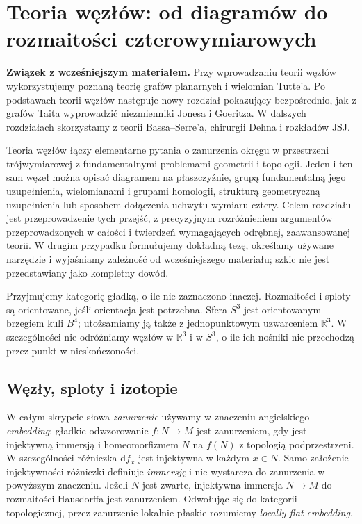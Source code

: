 \chapter{Teoria węzłów: od diagramów do rozmaitości czterowymiarowych}
\label{ch:teoria-wezlow}

\noindent\textbf{Związek z wcześniejszym materiałem.}
Przy wprowadzaniu teorii węzłów wykorzystujemy poznaną teorię
grafów planarnych i wielomian Tutte'a. Po podstawach teorii
węzłów następuje nowy rozdział pokazujący bezpośrednio, jak
z grafów Taita wyprowadzić niezmienniki Jonesa i Goeritza.
W dalszych rozdziałach skorzystamy z teorii Bassa--Serre'a,
chirurgii Dehna i rozkładów JSJ.


Teoria węzłów łączy elementarne pytania o zanurzenia okręgu w przestrzeni
trójwymiarowej z fundamentalnymi problemami geometrii i topologii.
Jeden i ten sam węzeł można opisać diagramem na płaszczyźnie, grupą
fundamentalną jego uzupełnienia, wielomianami i grupami homologii,
strukturą geometryczną uzupełnienia lub sposobem dołączenia uchwytu
wymiaru cztery. Celem rozdziału jest przeprowadzenie tych przejść,
z precyzyjnym rozróżnieniem argumentów przeprowadzonych w całości
i twierdzeń wymagających odrębnej, zaawansowanej teorii. W drugim
przypadku formułujemy dokładną tezę, określamy używane narzędzie
i wyjaśniamy zależność od wcześniejszego materiału; szkic nie jest
przedstawiany jako kompletny dowód.

Przyjmujemy kategorię gładką, o ile nie zaznaczono inaczej.
Rozmaitości i sploty są orientowane, jeśli orientacja jest potrzebna.
Sfera $S^3$ jest orientowanym brzegiem kuli $B^4$; utożsamiamy ją także
z jednopunktowym uzwarceniem $\mathbb R^3$. W szczególności
nie odróżniamy węzłów w $\mathbb R^3$ i w $S^3$, o ile ich nośniki
nie przechodzą przez punkt w nieskończoności.

\section{Węzły, sploty i izotopie}
\label{sec:kt-podstawy}

\begin{uwaga}
W całym skrypcie słowa \emph{zanurzenie} używamy w znaczeniu
angielskiego \emph{embedding}: gładkie odwzorowanie
$f\colon N\to M$ jest zanurzeniem, gdy jest injektywną immersją
i homeomorfizmem $N$ na $f(N)$ z topologią podprzestrzeni.
W szczególności różniczka $\mathrm df_x$ jest injektywna w każdym
$x\in N$. Samo założenie injektywności różniczki definiuje
\emph{immersję} i nie wystarcza do zanurzenia w powyższym
znaczeniu. Jeżeli $N$ jest zwarte, injektywna immersja
$N\to M$ do rozmaitości Hausdorffa jest zanurzeniem.
Odwołując się do kategorii topologicznej, przez zanurzenie
lokalnie płaskie rozumiemy \emph{locally flat embedding}.
\end{uwaga}



